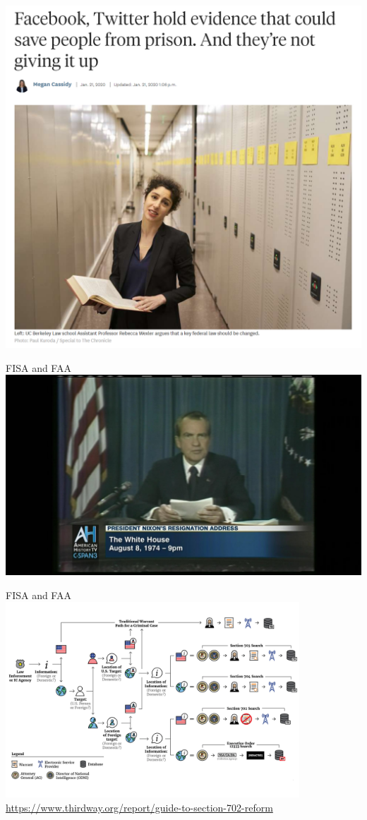 \documentclass[nobackground,dvipsnames,table,aspectratio=169]{beamer}
\begin{document}
\begin{frame}{}
    \thispagestyle{empty}
    \centering
    \includegraphics[height=0.95\paperheight]{exonerating-evidence}
\end{frame}

\begin{frame}{FISA and FAA}
    \includegraphics[width=\textwidth]{nixon-resignation}
\end{frame}

\begin{frame}{FISA and FAA}
    \centering
    \includegraphics[width=0.825\textwidth]{section-702-flowchart}
    \tiny
    \url{https://www.thirdway.org/report/guide-to-section-702-reform}
\end{frame}
\end{document}

